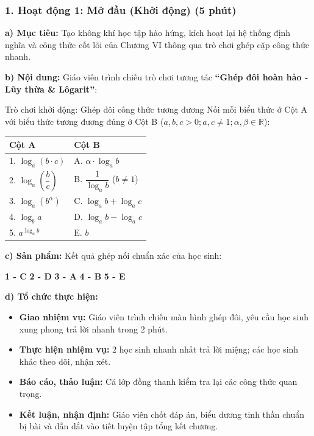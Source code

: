 \documentclass[12pt, a4paper]{article}
\begin{document}
\subsubsection*{1. Hoạt động 1: Mở đầu (Khởi động) (5 phút)}

\noindent \textbf{a) Mục tiêu:}
Tạo không khí học tập hào hứng, kích hoạt lại hệ thống định nghĩa và công thức cốt lõi của Chương VI thông qua trò chơi ghép cặp công thức nhanh.

\noindent \textbf{b) Nội dung:}
Giáo viên trình chiếu trò chơi tương tác \textbf{``Ghép đôi hoàn hảo - Lũy thừa \& Lôgarit''}:
\begin{pedabox}{Trò chơi khởi động: Ghép đôi công thức tương đương}
Nối mỗi biểu thức ở Cột A với biểu thức tương đương đúng ở Cột B ($a, b, c > 0; a, c \neq 1; \alpha, \beta \in \mathbb{R}$):
\begin{center}
\begin{tabular}{|l|l|}
\hline
\textbf{Cột A} & \textbf{Cột B} \\ \hline
1. $\log_a (b \cdot c)$ & A. $\alpha \cdot \log_a b$ \\ \hline
2. $\log_a \left(\dfrac{b}{c}\right)$ & B. $\dfrac{1}{\log_a b}$ ($b \neq 1$) \\ \hline
3. $\log_a (b^\alpha)$ & C. $\log_a b + \log_a c$ \\ \hline
4. $\log_b a$ & D. $\log_a b - \log_a c$ \\ \hline
5. $a^{\log_a b}$ & E. $b$ \\ \hline
\end{tabular}
\end{center}
\end{pedabox}

\noindent \textbf{c) Sản phẩm:}
Kết quả ghép nối chuẩn xác của học sinh:
\begin{center}
\textbf{1 - C} \quad \textbar \quad \textbf{2 - D} \quad \textbar \quad \textbf{3 - A} \quad \textbar \quad \textbf{4 - B} \quad \textbar \quad \textbf{5 - E}
\end{center}

\noindent \textbf{d) Tổ chức thực hiện:}
\begin{itemize}[leftmargin=0.6cm]
    \item \textbf{Giao nhiệm vụ:} Giáo viên trình chiếu màn hình ghép đôi, yêu cầu học sinh xung phong trả lời nhanh trong 2 phút.
    \item \textbf{Thực hiện nhiệm vụ:} 2 học sinh nhanh nhất trả lời miệng; các học sinh khác theo dõi, nhận xét.
    \item \textbf{Báo cáo, thảo luận:} Cả lớp đồng thanh kiểm tra lại các công thức quan trọng.
    \item \textbf{Kết luận, nhận định:} Giáo viên chốt đáp án, biểu dương tinh thần chuẩn bị bài và dẫn dắt vào tiết luyện tập tổng kết chương.
\end{itemize}
\end{document}
